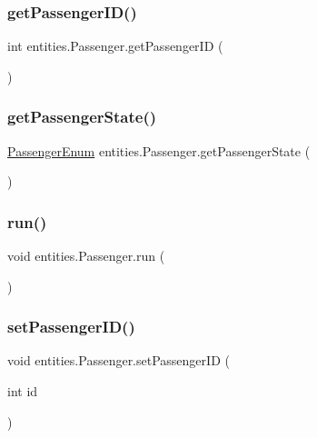 \subsubsection{\texorpdfstring{get\+Passenger\+I\+D()}{getPassengerID()}}
{\footnotesize\ttfamily int entities.\+Passenger.\+get\+Passenger\+ID (\begin{DoxyParamCaption}{ }\end{DoxyParamCaption})}

\mbox{\label{classentities_1_1_passenger_af9b423b481bf216dfe8fe019919e74fe}} 
\subsubsection{\texorpdfstring{get\+Passenger\+State()}{getPassengerState()}}
{\footnotesize\ttfamily \hyperlink{enumentities_1_1_passenger_enum}{Passenger\+Enum} entities.\+Passenger.\+get\+Passenger\+State (\begin{DoxyParamCaption}{ }\end{DoxyParamCaption})}

\mbox{\label{classentities_1_1_passenger_a7d58b79f61a46da11478760937d80c12}} 
\subsubsection{\texorpdfstring{run()}{run()}}
{\footnotesize\ttfamily void entities.\+Passenger.\+run (\begin{DoxyParamCaption}{ }\end{DoxyParamCaption})}

\mbox{\label{classentities_1_1_passenger_a007debe9191129c632c738311e15a7c4}} 
\subsubsection{\texorpdfstring{set\+Passenger\+I\+D()}{setPassengerID()}}
{\footnotesize\ttfamily void entities.\+Passenger.\+set\+Passenger\+ID (\begin{DoxyParamCaption}\item[{int}]{id }\end{DoxyParamCaption})}

